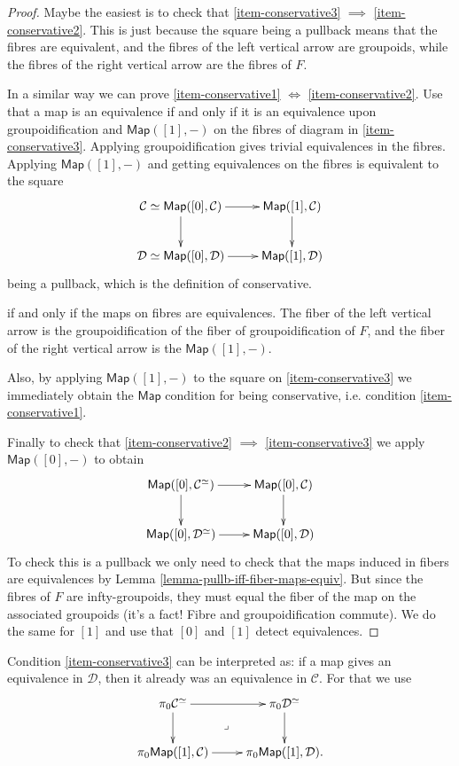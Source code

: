 \begin{proof}
Maybe the easiest is to check that
\ref{item-conservative3} $\implies$
\ref{item-conservative2}.
This is just because the square being a
pullback
means that the fibres are equivalent,
and the fibres of the left vertical arrow are
groupoids, while the fibres of the right
vertical
arrow are the fibres of $F$.

In a similar way we can prove
\ref{item-conservative1} $\iff$
\ref{item-conservative2}.
Use that a map is an equivalence if and only
if it is
an equivalence upon groupoidification and
$\mathsf{Map}([1],-)$
on the fibres of diagram in
\ref{item-conservative3}.
Applying groupoidification gives
trivial equivalences in the fibres.
Applying $\mathsf{Map}([1],-)$ and getting
equivalences on the fibres is equivalent to
the square
$$
\xymatrix{
\mathcal{C}\simeq\mathsf{Map}([0],\mathcal{C}
)
\ar[r]\ar[d]&
\mathsf{Map}([1],\mathcal{C})\ar[d]\\
\mathcal{D}\simeq
\mathsf{Map}([0],\mathcal{D})\ar[r]&
\mathsf{Map}([1],\mathcal{D})
}
$$
being a pullback, which is the definition of
conservative.

if and only if the maps on fibres
are equivalences. The fiber of the left
vertical arrow
is the groupoidification of the fiber of
groupoidification of $F$,
and the fiber of the right vertical arrow
is the $\mathsf{Map}([1],-)$.

Also, by applying $\mathsf{Map}([1],-)$ to
the square on \ref{item-conservative3}
we immediately obtain the $\mathsf{Map}$
condition
for being conservative, i.e. condition
\ref{item-conservative1}.

Finally to check that
\ref{item-conservative2} $\implies$
\ref{item-conservative3}
we apply $\mathsf{Map}([0],-)$ to obtain
$$
\xymatrix{
\mathsf{Map}([0],\mathcal{C}^\simeq)\ar[r]
\ar[d]
&\mathsf{Map}([0],\mathcal{C})\ar[d]\\
\mathsf{Map}([0],\mathcal{D}^{\simeq})\ar[r]&
\mathsf{Map}([0],\mathcal{D})
}
$$
To check this is a pullback we only need to
check that the maps induced in fibers are
equivalences
by  Lemma
\ref{lemma-pullb-iff-fiber-maps-equiv}.
But since the fibres of $F$ are
infty-groupoids,
they must equal the fiber of the map on the
associated groupoids
(it's a fact! Fibre and groupoidification
commute).
We do the same for $[1]$ and use that $[0]$
and $[1]$ detect
equivalences.
\end{proof}

Condition \ref{item-conservative3}
can be interpreted as:
if a map gives an equivalence in
$\mathcal{D}$,
then it already was an equivalence in
$\mathcal{C}$.
For that we use
$$
\xymatrix{
\pi_0\mathcal{C}^\simeq\ar[r]\ar[d]\ar@{}[dr]
|-{\lrcorner}&
\pi_0\mathcal{D}^\simeq\ar[d]\\
\pi_0\mathsf{Map}([1],\mathcal{C})\ar[r]&
\pi_0\mathsf{Map}([1],\mathcal{D}).
}
$$

